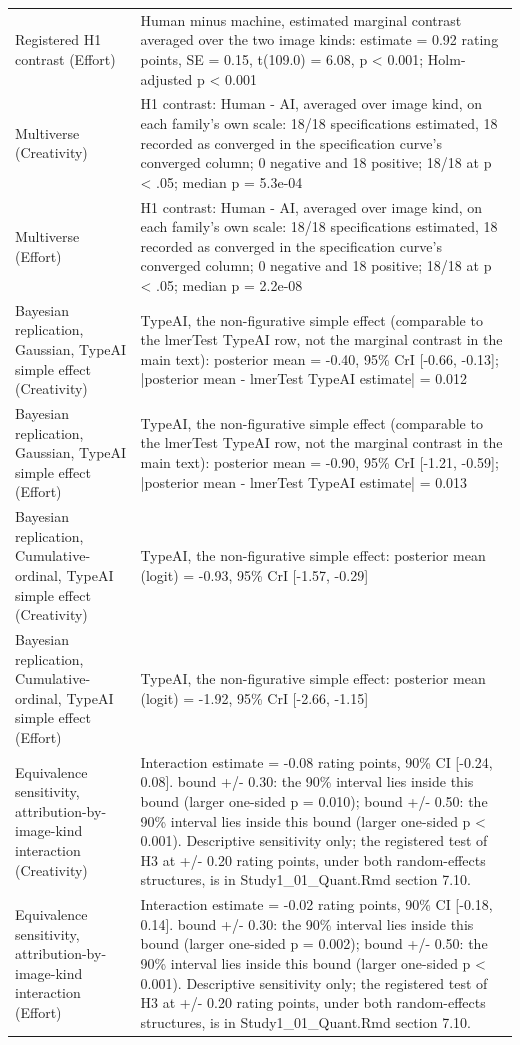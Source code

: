\begin{table}[!h]
\begin{tabular}[t]{>{\raggedright\arraybackslash}p{4.2cm}>{\raggedright\arraybackslash}p{10.8cm}}
Registered H1 contrast (Effort) & Human minus machine, estimated marginal contrast averaged over the two image kinds: estimate = 0.92 rating points, SE = 0.15, t(109.0) = 6.08, p < 0.001; Holm-adjusted p < 0.001\\
Multiverse (Creativity) & H1 contrast: Human - AI, averaged over image kind, on each family's own scale: 18/18 specifications estimated, 18 recorded as converged in the specification curve's converged column; 0 negative and 18 positive; 18/18 at p < .05; median p = 5.3e-04\\
Multiverse (Effort) & H1 contrast: Human - AI, averaged over image kind, on each family's own scale: 18/18 specifications estimated, 18 recorded as converged in the specification curve's converged column; 0 negative and 18 positive; 18/18 at p < .05; median p = 2.2e-08\\
Bayesian replication, Gaussian, TypeAI simple effect (Creativity) & TypeAI, the non-figurative simple effect (comparable to the lmerTest TypeAI row, not the marginal contrast in the main text): posterior mean = -0.40, 95\% CrI [-0.66, -0.13]; |posterior mean - lmerTest TypeAI estimate| = 0.012\\
\addlinespace
Bayesian replication, Gaussian, TypeAI simple effect (Effort) & TypeAI, the non-figurative simple effect (comparable to the lmerTest TypeAI row, not the marginal contrast in the main text): posterior mean = -0.90, 95\% CrI [-1.21, -0.59]; |posterior mean - lmerTest TypeAI estimate| = 0.013\\
Bayesian replication, Cumulative-ordinal, TypeAI simple effect (Creativity) & TypeAI, the non-figurative simple effect: posterior mean (logit) = -0.93, 95\% CrI [-1.57, -0.29]\\
Bayesian replication, Cumulative-ordinal, TypeAI simple effect (Effort) & TypeAI, the non-figurative simple effect: posterior mean (logit) = -1.92, 95\% CrI [-2.66, -1.15]\\
Equivalence sensitivity, attribution-by-image-kind interaction (Creativity) & Interaction estimate = -0.08 rating points, 90\% CI [-0.24, 0.08]. bound +/- 0.30: the 90\% interval lies inside this bound (larger one-sided p = 0.010); bound +/- 0.50: the 90\% interval lies inside this bound (larger one-sided p < 0.001). Descriptive sensitivity only; the registered test of H3 at +/- 0.20 rating points, under both random-effects structures, is in Study1\_01\_Quant.Rmd section 7.10.\\
Equivalence sensitivity, attribution-by-image-kind interaction (Effort) & Interaction estimate = -0.02 rating points, 90\% CI [-0.18, 0.14]. bound +/- 0.30: the 90\% interval lies inside this bound (larger one-sided p = 0.002); bound +/- 0.50: the 90\% interval lies inside this bound (larger one-sided p < 0.001). Descriptive sensitivity only; the registered test of H3 at +/- 0.20 rating points, under both random-effects structures, is in Study1\_01\_Quant.Rmd section 7.10.\\
\bottomrule
\end{tabular}
\end{table}